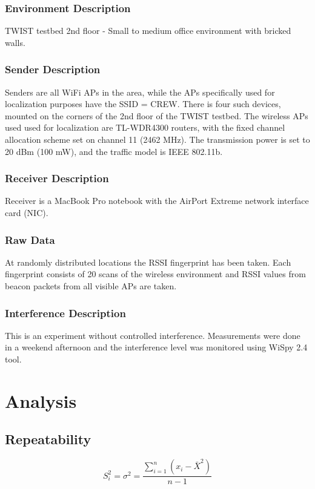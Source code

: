 \documentclass[11pt,a4paper,headinclude,footinclude,chapterprefix=on]{scrreprt}
\begin{document}
\subsection{Environment Description} TWIST testbed 2nd floor - Small to medium office environment with bricked walls.

\subsection{Sender Description} Senders are all WiFi APs in the area, while the APs specifically used for localization purposes have the SSID = CREW. There is four such devices, mounted on the corners of the 2nd floor of the TWIST testbed. The wireless APs used used for localization are TL-WDR4300 routers, with the fixed channel allocation scheme set on channel 11 (2462 MHz). The transmission power is set to 20 dBm (100 mW), and the traffic model is IEEE 802.11b.

\subsection{Receiver Description} Receiver is a MacBook Pro notebook with the AirPort Extreme network interface card (NIC).

\subsection{Raw Data} At randomly distributed locations the RSSI fingerprint has been taken. Each fingerprint consists of 20 scans of the wireless environment and RSSI values from beacon packets from all visible APs are taken.

\subsection{Interference Description} This is an experiment without controlled interference. Measurements were done in a weekend afternoon and the interference level was monitored using WiSpy 2.4 tool.

\chapter{Analysis} 
\section{Repeatability} 
\begin{equation}
	\label{eq:variance} {S}_i^2 = {\sigma}^2 = \frac{\sum\limits_{i=1}^{n} (x_{i} - \bar{X}^2)}{n-1} 
\end{equation}
\end{document}
